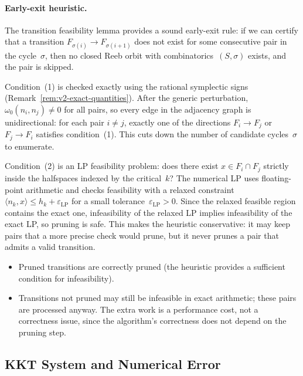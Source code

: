 \paragraph{Early-exit heuristic.}
The transition feasibility lemma provides a sound
early-exit rule: if we can certify that a transition
$F_{\sigma(i)} \to F_{\sigma(i+1)}$ does not exist for
some consecutive pair in the cycle~$\sigma$, then no
closed Reeb orbit with combinatorics~$(S, \sigma)$ exists,
and the pair is skipped.

Condition~(1) is checked exactly using the rational
symplectic signs (Remark~\ref{rem:v2-exact-quantities}).
After the generic perturbation, $\omega_0(n_i, n_j) \neq 0$
for all pairs, so every edge in the adjacency graph is
unidirectional: for each pair $i \neq j$, exactly one of
the directions $F_i \to F_j$ or $F_j \to F_i$ satisfies
condition~(1).
This cuts down the number of candidate
cycles~$\sigma$ to enumerate.

Condition~(2) is an LP feasibility problem:
does there exist $x \in F_i \cap F_j$ strictly inside
the halfspaces indexed by the critical~$k$?
The numerical LP uses floating-point arithmetic and
checks feasibility with a relaxed constraint
$\langle n_k, x \rangle \leq h_k + \varepsilon_{\mathrm{LP}}$
for a small tolerance~$\varepsilon_{\mathrm{LP}} > 0$.
Since the relaxed feasible region contains the exact one,
infeasibility of the relaxed LP implies infeasibility
of the exact LP, so pruning is safe.
This makes the heuristic conservative:
it may keep pairs that a more precise check would prune,
but it never prunes a pair that admits a valid transition.
\begin{itemize}
\item Pruned transitions are correctly pruned
  (the heuristic provides a sufficient condition for infeasibility).
\item Transitions not pruned may still be infeasible in
  exact arithmetic; these pairs are processed anyway.
  The extra work is a performance cost, not a
  correctness issue, since the algorithm's correctness
  does not depend on the pruning step.
\end{itemize}


\subsection{KKT System and Numerical Error}\label{app:v2-kkt}

